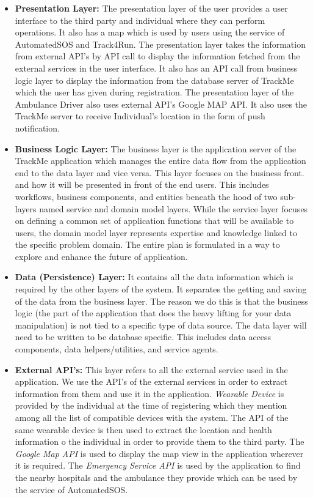 \begin{itemize}
\item \textbf{Presentation Layer:} The presentation layer of the user provides a user interface to the third party and individual where they can perform operations. It also has a map which is used by users using the service of AutomatedSOS and Track4Run. The presentation layer takes the information from external API's by API call to display the information fetched from the external services in the user interface. It also has an API call from business logic layer to display the information from the database server of TrackMe which the user has given during registration.\newline
The presentation layer of the Ambulance Driver also uses external API's Google MAP API. It also uses the TrackMe server to receive Individual's location in the form of push notification.
\item\textbf{Business Logic Layer:} The business layer is the application server of the TrackMe application which manages the entire data flow from the application end to the data layer and vice versa. This layer focuses on the business front. and how it will be presented in front of the end users. This includes workflows, business components, and entities beneath the hood of two sub-layers named service and domain model layers.\newline
While the service layer focuses on defining a common set of application functions that will be available to users, the domain model layer represents expertise and knowledge linked to the specific problem domain. The entire plan is formulated in a way to explore and enhance the future of application. 
\item\textbf{Data (Persistence) Layer:} It contains all the data information which is required by the other layers of the system. It separates the getting and saving of the data from the business layer. The reason we do this is that the business logic (the part of the application that does the heavy lifting for your data manipulation) is not tied to a specific type of data source. The data layer will need to be written to be database specific.  This includes data access components, data helpers/utilities, and service agents.
\item \textbf{External API's:} This layer refers to all the external service used in the application. We use the API's of the external services in order to extract information from them and use it in the application. \textit{Wearable Device} is provided by the individual at the time of registering which they mention among all the list of compatible devices with the system. The API of the same wearable device is then used to extract the location and health information o the individual in order to provide them to the third party. The \textit{Google Map API} is used to display the map view in the application wherever it is required. The \textit{Emergency Service API} is used by the application to find the nearby hospitals and the ambulance they provide which can be used by the service of AutomatedSOS. 
\end{itemize}

 